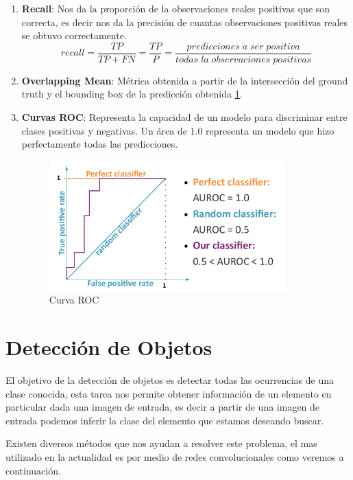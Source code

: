 \begin{enumerate}
\item \textbf{Recall}: Nos da la proporción de la observaciones reales positivas que son correcta, es decir nos da la precisión de cuantas observaciones positivas reales se obtuvo correctamente.
\begin{equation}
recall = \frac{TP}{TP+FN} = \frac{TP}{P} = \frac{predicciones\;a\;ser\;positiva}{todas\;la\;observaciones\;positivas} 
\end{equation}

\item \textbf{Overlapping Mean}: Métrica obtenida a partir de la intersección del ground truth y el bounding box de la predicción obtenida \ref{Fig: roc}.

\item \textbf{Curvas ROC}: Representa la capacidad de un modelo para discriminar entre clases positivas y negativas. Un área de 1.0 representa un modelo que hizo perfectamente todas las predicciones.
\begin{figure}[H]
 \centering
  \includegraphics[height=5cm,keepaspectratio=true,clip=true]{imagenes/MarcoTeorico/curvas-roc.png}
  \caption{Curva ROC}
	\label{Fig: roc}
\end{figure}


\end{enumerate}


\section{Detección de Objetos}\label{sec:compueter-vision}

El objetivo de la detección de objetos es detectar todas las ocurrencias de una clase conocida, esta tarea nos permite obtener información de un elemento en particular dada una imagen de entrada, es decir a partir de una imagen de entrada podemos inferir la clase del elemento que estamos deseando buscar. 

Existen diversos métodos que nos ayudan a resolver este problema, el mas utilizado en la actualidad es por medio de redes convolucionales como veremos a continuación.

